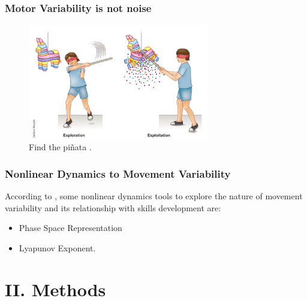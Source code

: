 \documentclass{beamer}
\begin{document}
 
 
  
 
 
\begin{frame}
  \frametitle{Motor Variability is not noise}

  
  \begin{figure}
 \includegraphics[width=0.7\textwidth]{herzfelt2014_fig1}
\centering 
\caption{Find the pi\~nata \textcolor{red}{\textbf{  \cite{Herzfeld2014}   }}.}
 \end{figure}
 
 

 
 
\end{frame}




 
\begin{frame}
\frametitle{Nonlinear Dynamics to  Movement Variability}
 

According to \textcolor{red}{\textbf{  \cite{Preatoni2013}   }},
some nonlinear dynamics tools to explore the nature of movement variability 
and its relationship with skills development are:
\begin{itemize}
    \item Phase Space Representation
    \item Lyapunov Exponent.
\end{itemize}


\end{frame}
 
 


\section{II. Methods}
\end{document}
